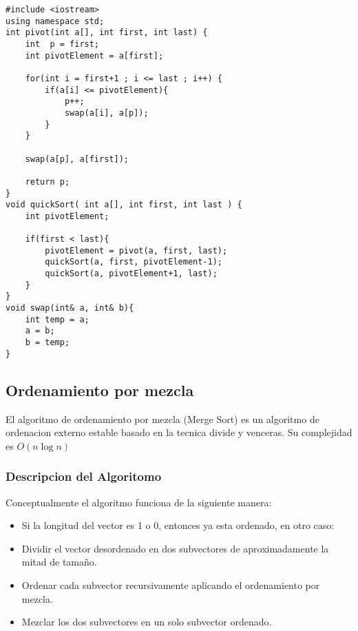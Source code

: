 \begin{lstlisting}[style=Cpp, label=QuickSort, caption=QuickSort]
#include <iostream>
using namespace std;
int pivot(int a[], int first, int last) {
    int  p = first;
    int pivotElement = a[first];
 
    for(int i = first+1 ; i <= last ; i++) {
        if(a[i] <= pivotElement){
            p++;
            swap(a[i], a[p]);
        }
    }
 
    swap(a[p], a[first]);
 
    return p;
}
void quickSort( int a[], int first, int last ) {
    int pivotElement;
 
    if(first < last){
        pivotElement = pivot(a, first, last);
        quickSort(a, first, pivotElement-1);
        quickSort(a, pivotElement+1, last);
    }
}
void swap(int& a, int& b){
    int temp = a;
    a = b;
    b = temp;
}
\end{lstlisting}

\subsection{Ordenamiento por mezcla}

El algoritmo de ordenamiento por mezcla (Merge Sort) es un algoritmo de ordenacion externo estable basado en la tecnica divide y venceras. Su complejidad es $ O(n \log n) $

\subsubsection{Descripcion del Algoritomo}

Conceptualmente el algoritmo funciona de la siguiente manera:

\begin{itemize}
\item Si la longitud del vector es 1 o 0, entonces ya esta ordenado, en otro caso:

\item Dividir el vector desordenado en dos subvectores de aproximadamente la mitad de tamaño.

\item Ordenar cada subvector recursivamente aplicando el ordenamiento por mezcla.

\item Mezclar los dos subvectores en un solo subvector ordenado.

\end{itemize}

